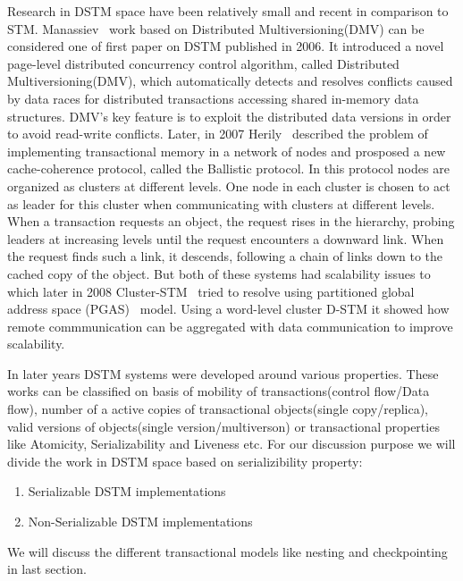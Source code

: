 \documentclass[12pt,english]{report}
\begin{document}
Research in DSTM space have been relatively small and recent in comparison to STM. Manassiev~\cite{Manassiev:2006:EDV:1122971.1123002} work based on Distributed Multiversioning(DMV) can be considered one of first paper on DSTM published in 2006. It
introduced a novel page-level distributed concurrency control algorithm, called Distributed Multiversioning(DMV), which automatically detects and resolves conflicts caused by data races for distributed transactions accessing shared in-memory data structures. DMV’s key feature is to exploit the distributed data versions in order to avoid read-write conflicts. Later,
in 2007 Herily~\cite{Herilhy:2007:BallisticProtocal} described the problem of implementing transactional memory in a network of nodes and prosposed a new cache-coherence protocol,
called the Ballistic protocol. In this protocol nodes are organized as clusters at different levels. One node in each cluster is chosen to act as leader for this cluster when communicating with clusters at different levels. When a transaction requests an object, the request rises in the hierarchy, probing leaders at increasing levels until the request encounters a downward link. When the request finds such a link, it descends, following a chain of links down to the cached copy of the object. But both of these systems had scalability issues to which later in 2008 Cluster-STM~\cite{Bocchino:2008:STM:1345206.1345242} tried to resolve using partitioned global address space (PGAS)~\cite{PGAS:Programmin:Model} model. Using a word-level cluster D-STM it showed how remote commmunication can be aggregated with data communication to improve scalability. 

In later years DSTM systems were developed around various properties. These works can be classified on basis of mobility of transactions(control flow/Data flow), number of a active copies of transactional objects(single copy/replica), valid versions of objects(single version/multiverson) or transactional properties like Atomicity, Serializability and Liveness etc. For our discussion purpose we will divide the work in DSTM space based on serializibility property:
\begin{enumerate}
\item Serializable DSTM implementations
\item Non-Serializable DSTM implementations 
\end{enumerate}

We will discuss the different transactional models like nesting and checkpointing in last section. 
\end{document}
